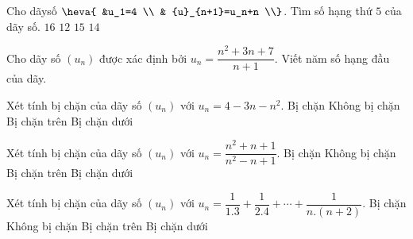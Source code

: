 \begin{ex}%
	Cho  dãysố $\heva{
	&u_1=4 \\ 
	& {u}_{n+1}=u_n+n \\}$. Tìm số hạng  thứ $5$ của dãy số.
	\choice 
		{$16$} 
		{$12$} 
		 {$15$}
		{\True $14$} 
\end{ex}

\begin{bt}%
	Cho dãy số $(u_n)$ được xác định bởi  $u_n=\dfrac{n^2+3n+7}{n+1}$. Viết năm số hạng đầu của dãy.
\end{bt}

\begin{ex}%
	Xét  tính bị chặn của dãy số $(u_n)$ với $u_n=4-3n-n^2$.
	 \choice
		 {Bị chặn}
		 {Không bị chặn}
		{\True Bị chặn trên} 
		{Bị chặn  dưới}
\end{ex}

\begin{ex}%
	Xét tính bị  chặn của dãy số $(u_n)$ với $u_n=\dfrac{n^2+n+1}{n^2-n+1}$.
	 \choice
		 {\True Bị chặn}
		{Không  bị chặn}
		 {Bị chặn trên}
		{Bị chặn dưới} 
\end{ex}

\begin{ex}%
	Xét tính bị chặn của dãy số $(u_n)$ với $u_n=\dfrac{1}{1.3}+\dfrac{1}{2.4}+\cdots +\dfrac{1}{n.(n+2)}$. 
	\choice 
		{\True Bị  chặn}
		{Không bị chặn} 
		{Bị  chặn trên}
		{Bị chặn  dưới}
\end{ex}

